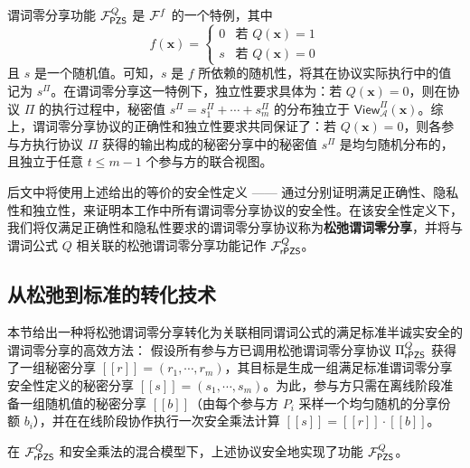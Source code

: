 谓词零分享功能 $\mathcal{F}_\mathsf{PZS}^Q$ 是 $\mathcal{F}^f$ 的一个特例，其中
$$f(\textbf{x}) =
\begin{cases}
  0 & \text{若 } Q(\textbf{x}) = 1 \\
  s & \text{若 } Q(\textbf{x}) = 0
\end{cases}$$
且 $s$ 是一个随机值。可知，$s$ 是 $f$ 所依赖的随机性，将其在协议实际执行中的值记为 $s^\Pi$。在谓词零分享这一特例下，独立性要求具体为：若 $Q(\textbf{x}) = 0$，则在协议 $\Pi$ 的执行过程中，秘密值 $s^{\Pi} = s^{\Pi}_1 + \cdots + s^{\Pi}_m$ 的分布独立于 $\mathsf{View}_{\mathcal{A}}^\Pi(\textbf{x})$。综上，谓词零分享协议的正确性和独立性要求共同保证了：若 $Q(\textbf{x}) = 0$，则各参与方执行协议 $\Pi$ 获得的输出构成的秘密分享中的秘密值 $s^{\Pi}$ 是均匀随机分布的，且独立于任意 $t \le m-1$ 个参与方的联合视图。

\begin{remark}
后文中将使用上述给出的等价的安全性定义 —— 通过分别证明满足正确性、隐私性和独立性，来证明本工作中所有谓词零分享协议的安全性。在该安全性定义下，我们将仅满足正确性和隐私性要求的谓词零分享协议称为\textbf{松弛谓词零分享}，并将与谓词公式 $Q$ 相关联的松弛谓词零分享功能记作 $\mathcal{F}_\mathsf{rPZS}^Q$。
\end{remark}

\subsection{从松弛到标准的转化技术}\label{transform-pzs}

本节给出一种将松弛谓词零分享转化为关联相同谓词公式的满足标准半诚实安全的谓词零分享的高效方法：
假设所有参与方已调用松弛谓词零分享协议 $\Pi_\mathsf{rPZS}^Q$ 获得了一组秘密分享 $[\! [ r ] \!] = (r_1, \cdots, r_m)$，其目标是生成一组满足标准谓词零分享安全性定义的秘密分享 $[\! [ s ] \!] = (s_1, \cdots, s_m)$。为此，参与方只需在离线阶段准备一组随机值的秘密分享 $[\! [ b ] \!]$（由每个参与方 $P_i$ 采样一个均匀随机的分享份额 $b_i$），并在在线阶段协作执行一次安全乘法计算 $[\! [ s ] \!] = [\! [ r ] \!] \cdot [\! [ b ] \!]$。

\begin{theorem} \label{theorem:bssPMT}
在 $\mathcal{F}_\mathsf{rPZS}^Q$ 和安全乘法的混合模型下，上述协议安全地实现了功能 $\mathcal{F}_\mathsf{PZS}^Q$。
\end{theorem}

